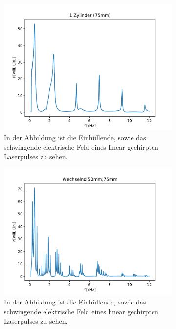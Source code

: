 \begin{figure}[ht]
\begin{subfigure}[b]{0.45\textwidth}
                    \includegraphics[scale=0.45]{./pictures/1_Zylinder_75mm.pdf}
                    \caption{In der Abbildung ist die Einhüllende, sowie das schwingende elektrische Feld eines linear gechirpten Laserpulses zu sehen.}
                    \label{fig:1_Zylinder_75mm}
                \end{subfigure}
                \centering
                \begin{subfigure}[b]{0.45\textwidth}
                    \centering
                    \includegraphics[scale=0.45]{./pictures/1dim_10_Zylinder_wechselnd_50_75.pdf}
                    \caption{In der Abbildung ist die Einhüllende, sowie das schwingende elektrische Feld eines linear gechirpten Laserpulses zu sehen.}
                    \label{fig:1dim_10_Zylinder_wechselnd_50_75}
                \end{subfigure}
                \caption{ }
                \label{fig:Wechselabbildung}
            \end{figure}
            \FloatBarrier
            
